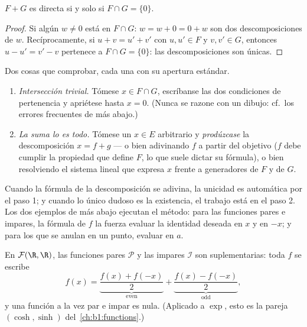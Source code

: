 \begin{proposition}\label{prop:b1:vspaces:directsum}
$F + G$ es directa si y solo si $F \cap G = \{0\}$.
\end{proposition}

\begin{proof}
Si algún $w \neq 0$ está en $F \cap G$: $w = w + 0 = 0 + w$ son dos
descomposiciones de $w$. Recíprocamente, si $u + v = u' + v'$ con
$u, u' \in F$ y $v, v' \in G$, entonces $u - u' = v' - v$ pertenece a
$F \cap G = \{0\}$: las descomposiciones son únicas.
\end{proof}

\begin{method}[Demostrar que $E = F \oplus G$]
\label{met:b1:vspaces:directsum}
Dos cosas que comprobar, cada una con su apertura estándar.
\begin{enumerate}
  \item \emph{Intersección trivial.} Tómese $x \in F \cap G$,
        escríbanse las dos condiciones de pertenencia y apriétese
        hasta $x = 0$. (Nunca se razone con un dibujo: cf.\ los
        errores frecuentes de más abajo.)
  \item \emph{La suma lo es todo.} Tómese un $x \in E$ arbitrario y
        \emph{prodúzcase} la descomposición $x = f + g$ --- o bien
        adivinando $f$ a partir del objetivo ($f$ debe cumplir la
        propiedad que define $F$, lo que suele dictar su fórmula), o
        bien resolviendo el sistema lineal que expresa $x$ frente a
        generadores de $F$ y de $G$.
\end{enumerate}
Cuando la fórmula de la descomposición se adivina, la unicidad es
automática por el paso 1; y cuando lo único dudoso es la existencia,
el trabajo está en el paso 2. Los dos ejemplos de más abajo ejecutan
el método: para las funciones pares e impares, la fórmula de $f$ la
fuerza evaluar la identidad deseada en $x$ y en $-x$; y para los
 que se anulan en un punto, evaluar en $a$.
\end{method}

\begin{example}\label{ex:b1:vspaces:evenodd}
En $\mathcal{F}(\R, \R)$, las funciones pares $\mathcal{P}$ y las
impares $\mathcal{I}$ son suplementarias: toda $f$ se escribe
\[
f(x) = \underbrace{\frac{f(x) + f(-x)}{2}}_{\text{even}}
+ \underbrace{\frac{f(x) - f(-x)}{2}}_{\text{odd}},
\]
y una función a la vez par e impar es nula. (Aplicado a $\exp$, esto
es la pareja $(\cosh, \sinh)$ del~\cref{ch:b1:functions}.)
\end{example}

